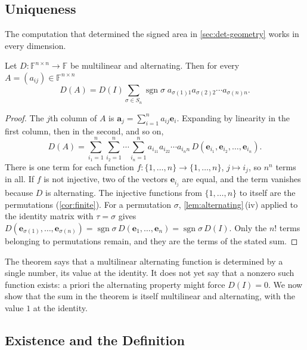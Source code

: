 \subsection{Uniqueness}

The computation that determined the signed area in \cref{sec:det-geometry} works in every dimension.

\begin{theorem}
\label{thm:det-uniqueness}
Let $D\colon\mathbb F^{n\times n}\to\mathbb F$ be multilinear and alternating. Then for every $A=(a_{ij})\in\mathbb F^{n\times n}$
\[
D(A)=D(I)\sum_{\sigma\in S_n}\operatorname{sgn}\sigma\;a_{\sigma(1)1}a_{\sigma(2)2}\cdots a_{\sigma(n)n} .
\]
\end{theorem}

\begin{proof}
The $j$th column of $A$ is $\mathbf a_j=\sum_{i=1}^na_{ij}\mathbf e_i$. Expanding by linearity in the first column, then in the second, and so on,
\[
D(A)=\sum_{i_1=1}^n\sum_{i_2=1}^n\cdots\sum_{i_n=1}^na_{i_11}a_{i_22}\cdots a_{i_nn}\,D(\mathbf e_{i_1},\mathbf e_{i_2},\ldots,\mathbf e_{i_n}).
\]
There is one term for each function $f\colon\{1,\ldots,n\}\to\{1,\ldots,n\}$, $j\mapsto i_j$, so $n^n$ terms in all. If $f$ is not injective, two of the vectors $\mathbf e_{i_j}$ are equal, and the term vanishes because $D$ is alternating. The injective functions from $\{1,\ldots,n\}$ to itself are the permutations (\cref{cor:finite}). For a permutation $\sigma$, \cref{lem:alternating}\,(iv) applied to the identity matrix with $\tau=\sigma$ gives $D(\mathbf e_{\sigma(1)},\ldots,\mathbf e_{\sigma(n)})=\operatorname{sgn}\sigma\,D(\mathbf e_1,\ldots,\mathbf e_n)=\operatorname{sgn}\sigma\,D(I)$. Only the $n!$ terms belonging to permutations remain, and they are the terms of the stated sum.
\end{proof}

The theorem says that a multilinear alternating function is determined by a single number, its value at the identity. It does not yet say that a nonzero such function exists: a priori the alternating property might force $D(I)=0$. We now show that the sum in the theorem is itself multilinear and alternating, with the value $1$ at the identity.

\subsection{Existence and the Definition}

